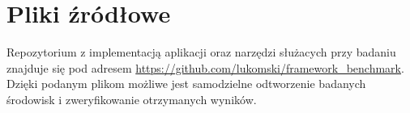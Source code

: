 \section{Pliki źródłowe}

Repozytorium z implementacją aplikacji oraz narzędzi służacych przy badaniu znajduje się pod adresem \url{https://github.com/lukomski/framework_benchmark}.
Dzięki podanym plikom możliwe jest samodzielne odtworzenie badanych środowisk i zweryfikowanie otrzymanych wyników.